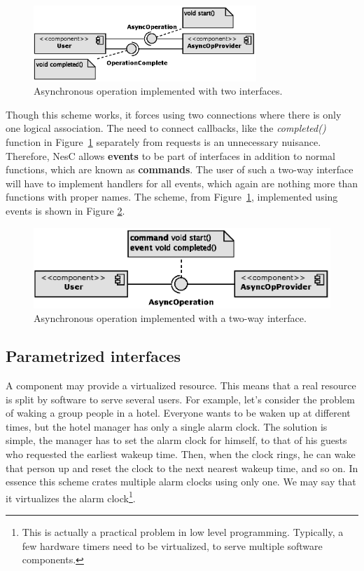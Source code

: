 \begin{figure}[h]
  \centering
  \includegraphics[width=0.75\textwidth]{diagrams/two_way_interface1.eps}
  \caption{Asynchronous operation implemented with two interfaces.}
  \label{fig:two_way_interface1}
\end{figure}

Though this scheme works, it forces using two connections where there is only one logical association. The need to connect callbacks, like the \emph{completed()} function in Figure~\ref{fig:two_way_interface1} separately from requests is an unnecessary nuisance. Therefore, NesC allows {\bf events} to be part of interfaces in addition to normal functions, which are known as {\bf commands}. The user of such a two-way interface will have to implement handlers for all events, which again are nothing more than functions with proper names. The scheme, from Figure~\ref{fig:two_way_interface1}, implemented using events is shown in Figure \ref{fig:two_way_interface2}.

\begin{figure}[h]
  \centering
  \includegraphics{diagrams/two_way_interface2.eps}
  \caption{Asynchronous operation implemented with a two-way interface.}
  \label{fig:two_way_interface2}
\end{figure}

\subsection{Parametrized interfaces}
A component may provide a virtualized resource. This means that a real resource is split by software to serve several users. For example, let's consider the problem of waking a group people in a hotel.  Everyone wants to be waken up at different times, but the hotel manager has only a single alarm clock. The solution is simple, the manager has to set the alarm clock for himself, to that of his guests who requested the earliest wakeup time. Then, when the clock rings, he can wake that person up and reset the clock to the next nearest wakeup time, and so on. In essence this scheme crates multiple alarm clocks using only one. We may say that it virtualizes the alarm clock\footnote{This is actually a practical problem in low level programming. Typically, a few hardware timers need to be virtualized, to serve multiple software components.}.

